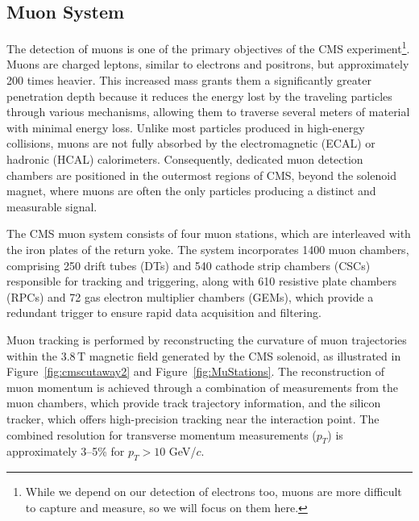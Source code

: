 \subsection{Muon System}

The detection of muons is one of the primary objectives of the CMS experiment\footnote{While we depend on our detection of electrons too, muons are more difficult to capture and measure, so we will focus on them here.}. Muons are charged leptons, similar to electrons and positrons, but approximately 200 times heavier. This increased mass grants them a significantly greater penetration depth because it reduces the energy lost by the traveling particles through various mechanisms, allowing them to traverse several meters of material with minimal energy loss. Unlike most particles produced in high-energy collisions, muons are not fully absorbed by the electromagnetic (ECAL) or hadronic (HCAL) calorimeters. Consequently, dedicated muon detection chambers are positioned in the outermost regions of CMS, beyond the solenoid magnet, where muons are often the only particles producing a distinct and measurable signal.

The CMS muon system consists of four muon stations, which are interleaved with the iron plates of the return yoke. The system incorporates 1400 muon chambers, comprising 250 drift tubes (DTs) and 540 cathode strip chambers (CSCs) responsible for tracking and triggering, along with 610 resistive plate chambers (RPCs) and 72 gas electron multiplier chambers (GEMs), which provide a redundant trigger to ensure rapid data acquisition and filtering.

Muon tracking is performed by reconstructing the curvature of muon trajectories within the $3.8\,\mathrm{T}$ magnetic field generated by the CMS solenoid, as illustrated in Figure~\ref{fig:cmscutaway2} and Figure~\ref{fig:MuStations}. The reconstruction of muon momentum is achieved through a combination of measurements from the muon chambers, which provide track trajectory information, and the silicon tracker, which offers high-precision tracking near the interaction point. The combined resolution for transverse momentum measurements (\( p_T \)) is approximately 3--5\% for \( p_T > 10 \) GeV/\( c \).

